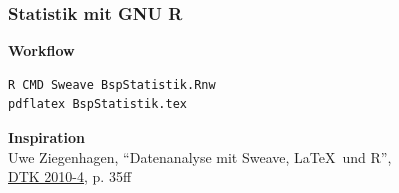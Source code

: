 \documentclass[]{beamer}
\begin{document}
\begin{frame}[fragile]
\frametitle{Statistik mit GNU R}

\begin{minipage}{.45\linewidth}
\end{minipage}
\hfill
\begin{minipage}{.45\linewidth}
\textbf{Workflow}
\begin{lstlisting}[style=arn:lst:bash]
R CMD Sweave BspStatistik.Rnw
pdflatex BspStatistik.tex
\end{lstlisting}

\bigskip

\textbf{Inspiration}\\
Uwe Ziegenhagen, \enquote{Datenanalyse mit Sweave, \LaTeX\ und R},\\ \href{http://www.dante.de/DTK/Ausgaben/dtk104.pdf}{DTK 2010-4}, p. 35ff
\end{minipage}

\end{frame}
\end{document}
